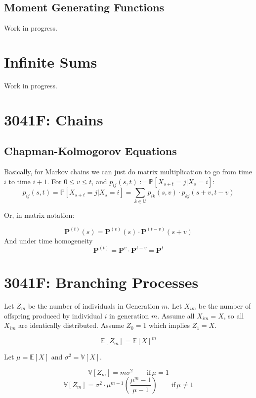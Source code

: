 \documentclass[12pt]{article}
\begin{document}
\subsection{Moment Generating Functions}
Work in progress.
\section{Infinite Sums}
Work in progress.
\section{3041F: Chains}
\subsection{Chapman-Kolmogorov Equations}
Basically, for Markov chains we can just do matrix multiplication to go from time \(i\) to time \(i + 1\).
For \(0 \le v \le t\), and \(p_{ij}(s, t) := \mathbb{P}[X_{s+t} = j | X_s = i]\):
\begin{equation*}
    p_{ij}(s, t) = \mathbb{P}[X_{s+t} = j | X_s = i] = 
    \sum_{k \in \mathcal{U}}p_{ik}(s, v) \cdot p_{kj}(s + v, t - v)
\end{equation*}

Or, in matrix notation:

\begin{equation*}
    \mathbf{P}^{(t)}(s) = \mathbf{P}^{(v)}(s) \cdot \mathbf{P}^{(t-v)}(s + v)
\end{equation*}
And under time homogeneity
\begin{equation*}
    \mathbf{P}^{(t)} = \mathbf{P}^{v} \cdot \mathbf{P}^{t-v} = \mathbf{P}^{t} 
\end{equation*}
\section{3041F: Branching Processes}
Let \(Z_m\) be the number of individuals in Generation \(m\).
Let \(X_{im}\) be the number of offspring produced by individual \(i\) in generation \(m\).
Assume all \(X_{im} = X\), so all \(X_{im}\) are identically distributed.
Assume \(Z_0 = 1\) which implies \(Z_1 = X\).

\begin{equation*}
    \mathbb{E}[Z_m] = \mathbb{E}[X]^m
\end{equation*}

Let \(\mu =\mathbb{E}[X]\) and \(\sigma^2 = \mathbb{V}[X]\).

\begin{equation*}
    \mathbb{V}[Z_m] = m\sigma^2 \qquad \text{if} \, \mu = 1
\end{equation*}
\begin{equation*}
    \mathbb{V}[Z_m] = \sigma^2 \cdot \mu^{m-1} \left( \frac{\mu^{m} - 1}{\mu - 1} \right) \qquad \text{if}\, \mu \ne 1
\end{equation*}
\end{document}
